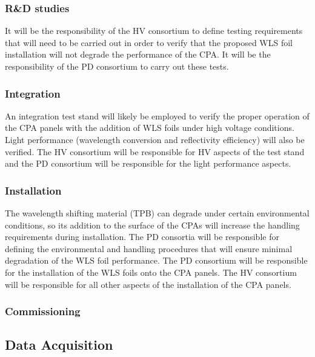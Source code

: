 \subsubsection{R\&D studies}
It will be the responsibility of the HV consortium to define testing requirements that will need to be carried out in order to verify that the proposed WLS foil installation will not degrade the performance of the CPA. It will be the responsibility of the PD consortium to carry out these tests.

\subsubsection{Integration} 
An integration test stand will likely be employed to verify the proper operation of the CPA panels with the addition of WLS foils under high voltage conditions. Light performance (wavelength conversion and reflectivity efficiency) will also be verified. The HV consortium will be responsible for HV aspects of the test stand and the PD consortium will be responsible for the light performance aspects.

\subsubsection{Installation} 
The wavelength shifting material (TPB) can degrade under certain environmental conditions, so its addition to the surface of the CPAs will increase the handling requirements during installation. The PD consortia will be responsible for defining the environmental and handling procedures that will ensure minimal degradation of the WLS foil performance. The PD consortium will be responsible for the installation of the WLS foils onto the CPA panels. The HV consortium will be responsible for all other aspects of the installation of the CPA panels.

\subsubsection{Commissioning} 


\subsection{Data Acquisition}
\label{sec:fdsp-pd-intfc-daq}

